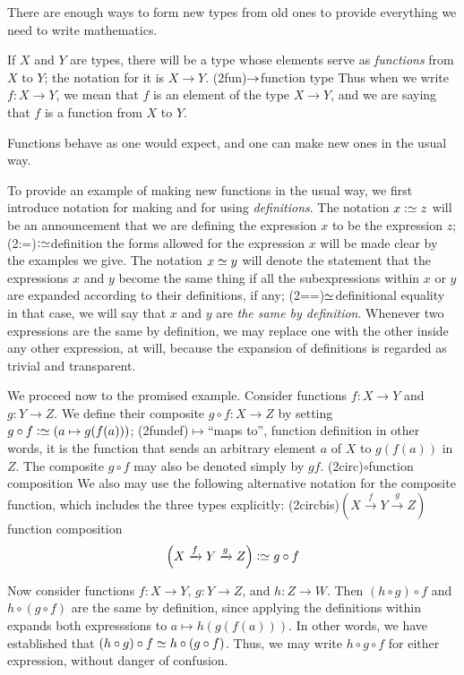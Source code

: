 There are enough ways to form new types from old ones to provide everything we need to write mathematics.

If $X$ and $Y$ are types, there will be a type whose elements serve as
\emph{functions} from $X$ to $Y$;
the notation for it is $X \to Y$.%
\glossary(2fun){$\protect\to$}{function type}
Thus when we write $f : X \to Y$, we mean that $f$ is an element of the type $X \to Y$, 
and we are saying that $f$ is a function from $X$ to $Y$.

Functions behave as one would expect, and one can make new ones in the usual way.

To provide an example of making new functions in the usual way, we first introduce notation for making and for using \emph{definitions}.
The notation $x \defeq z$ will be an announcement that we are defining
the expression $x$ to be the expression $z$;%
\glossary(2:=){$\defeq$}{definition}
the forms allowed for the
expression $x$ will be made clear by the examples we give.
The notation $x \jdeq y$ will denote the statement that the expressions $x$ and $y$
become the same thing if all the subexpressions within $x$ or $y$ are expanded according to their definitions, if any;%
\glossary(2==){$\jdeq$}{definitional equality}
in that case, we will say
that $x$ and $y$ are \emph{the same by definition}.  Whenever two expressions are the same by definition, we may replace one with the other
inside any other expression, at will, because the expansion of definitions is regarded as trivial and transparent.

We proceed now to the promised example.  Consider functions $f : X \to Y$ and $g : Y \to Z$.  We define their composite $g \circ f : X \to Z$ by
setting $g \circ f \defeq (a \mapsto g(f(a)))$;%
\glossary(2fundef){$\mapsto$}{``maps to'', function definition}
in other words, it is the function that sends an arbitrary element $a$ of $X$ to $g(f(a))$ in
$Z$.  The composite $g \circ f$ may also be denoted simply by $gf$.%
\glossary(2circ){$\circ$}{function composition}
We also may use the following alternative notation for the composite function, which includes the three types explicitly:%
\glossary(2circbis){$ ( X \xrightarrow f Y \xrightarrow g Z ) $}%
{function composition}
\[
  \left( X \xrightarrow f Y \xrightarrow g Z \right) \defeq g \circ f
\]

Now consider functions $f : X \to Y$, $g : Y \to Z$, and $h : Z \to W$.  Then $(h \circ g) \circ f$ and $h \circ (g \circ f)$ are the same by
definition, since applying the definitions within expands both expresssions to $a \mapsto h(g(f(a)))$.  In other
words, we have established that $(h \circ g) \circ f \jdeq h \circ (g \circ f)$.  Thus, we may write $h \circ g \circ f$ for
either expression, without danger of confusion.

